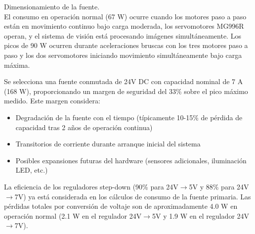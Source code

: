 Dimensionamiento de la fuente.\\
\noindent
El consumo en operación normal (67 W) ocurre cuando los motores paso a paso están en movimiento continuo bajo carga moderada, los servomotores MG996R operan, y el sistema de visión está procesando imágenes simultáneamente. Los picos de 90 W ocurren durante aceleraciones bruscas con los tres motores paso a paso y los dos servomotores iniciando movimiento simultáneamente bajo carga máxima.

Se selecciona una fuente conmutada de 24V DC con capacidad nominal de 7 A (168 W), proporcionando un margen de seguridad del 33\% sobre el pico máximo medido. Este margen considera:

\begin{itemize}[label=$\bullet$]
\item Degradación de la fuente con el tiempo (típicamente 10-15\% de pérdida de capacidad tras 2 años de operación continua)
\item Transitorios de corriente durante arranque inicial del sistema
\item Posibles expansiones futuras del hardware (sensores adicionales, iluminación LED, etc.)
\end{itemize}

La eficiencia de los reguladores step-down (90\% para 24V$\rightarrow$5V y 88\% para 24V$\rightarrow$7V) ya está considerada en los cálculos de consumo de la fuente primaria. Las pérdidas totales por conversión de voltaje son de aproximadamente 4.0 W en operación normal (2.1 W en el regulador 24V$\rightarrow$5V y 1.9 W en el regulador 24V$\rightarrow$7V).